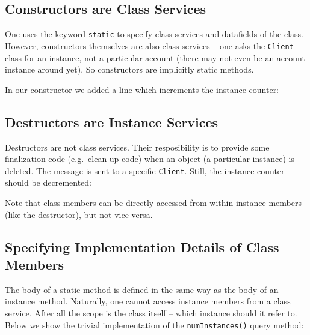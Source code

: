 \subsection{Constructors are Class Services}

One uses the keyword \verb+static+ to specify class services and datafields
of the class. However, constructors themselves are also class services --
one asks the \verb+Client+ class for an instance, not a particular
account (there may not even be an account instance around yet).
So constructors are implicitly static methods. 

In our constructor we added a line which increments the instance counter:



\subsection{Destructors are Instance Services}

Destructors are not class services. Their resposibility is to provide some
finalization code (e.g.\ clean-up code) when an object (a particular
instance) is deleted. The message is sent to a specific \verb+Client+.
Still, the instance counter should be decremented:


Note that class members can be directly accessed from within instance members 
(like the destructor), but not vice versa.


\subsection{Specifying Implementation Details of Class Members}

The body of a static method is defined in the same way as the body of an 
instance method. Naturally, one cannot access instance members from a class
service. After all the scope is the class itself -- which instance should
it refer to. Below we show the trivial implementation of the 
\verb+numInstances()+ query method:

